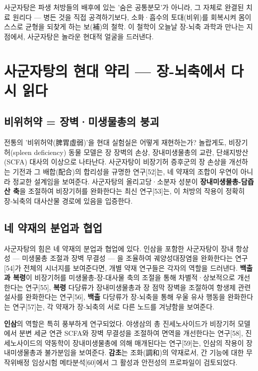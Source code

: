 \documentclass[11pt,oneside]{book}
\begin{document}
사군자탕은 파생 처방들의 배후에 있는 '숨은 공통분모'가 아니라, 그 자체로 완결된 치료 원리다 — 병든 것을 직접 공격하기보다, 소화·흡수의 토대(비위)를 회복시켜 몸이 스스로 균형을 되찾게 하는 보(補)의 철학. 이 철학이 오늘날 장-뇌축 과학과 만나는 지점에서, 사군자탕은 놀라운 현대적 얼굴을 드러낸다.

\section{사군자탕의 현대 약리 — 장-뇌축에서 다시 읽다}
\subsection{비위허약 = 장벽·미생물총의 붕괴}
전통의 '비위허약(脾胃虛弱)'을 현대 실험실은 어떻게 재현하는가? 놀랍게도, 비장기허(spleen deficiency) 동물 모델은 장 장벽의 손상, 장내미생물총의 교란, 단쇄지방산(SCFA) 대사의 이상으로 나타난다. 사군자탕이 비장기허 증후군의 장 손상을 개선하는 기전과 그 배합(配合)의 합리성을 규명한 연구[52]는, 네 약재의 조합이 우연이 아니라 정교한 설계임을 보여준다. 사군자탕의 올리고당·소분자 성분이 \textbf{장내미생물총-담즙산 축}을 조절하여 비장기허를 완화한다는 최신 연구[53]는, 이 처방의 작용이 정확히 장-뇌축의 대사산물 경로에 있음을 입증한다.

\subsection{네 약재의 분업과 협업}
사군자탕의 힘은 네 약재의 분업과 협업에 있다. 인삼을 포함한 사군자탕이 장내 항상성 — 미생물총 조절과 장벽 무결성 — 을 조율하여 궤양성대장염을 완화한다는 연구[54]가 전체의 시너지를 보여준다면, 개별 약재 연구들은 각자의 역할을 드러낸다. \textbf{백출과 복령}이 비장기허를 미생물총-장-대사물 축의 조절을 통해 차별적·상보적으로 개선한다는 연구[55], \textbf{복령} 다당류가 장내미생물총과 장 점막 장벽을 조절하여 항생제 관련 설사를 완화한다는 연구[56], \textbf{백출} 다당류가 장-뇌축을 통해 우울 유사 행동을 완화한다는 연구[57]는, 각 약재가 장-뇌축의 서로 다른 노드를 겨냥함을 보여준다.

\textbf{인삼}의 역할은 특히 풍부하게 연구되었다. 야생삼의 총 진세노사이드가 비장기허 모델에서 분변 세균 연관 SCFA와 장벽 무결성을 조절하여 면역을 개선한다는 연구[58], 진세노사이드의 약동학이 장내미생물총에 의해 매개된다는 연구[59]는, 인삼의 작용이 장내미생물총과 불가분임을 보여준다. \textbf{감초}는 조화(調和)의 약재로서, 간 기능에 대한 무작위배정 임상시험 메타분석[60]에서 그 활성과 안전성의 프로파일이 검토되었다.
\end{document}
